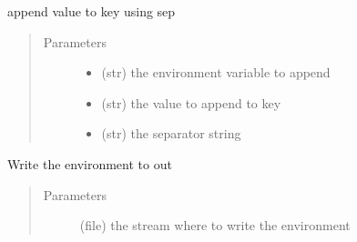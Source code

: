 \documentclass[a4paper,10pt,english]{sphinxmanual}
\begin{document}
\begin{fulllineitems}
\begin{fulllineitems}
\begin{quote}
\begin{description}
\end{description}\end{quote}

\end{fulllineitems}


\begin{fulllineitems}
\label{\detokenize{apidoc_src/src:src.environment.SalomeEnviron.append}}
append value to key using sep
\begin{quote}\begin{description}
\item[{Parameters}] \leavevmode\begin{itemize}
\item {} 
 \textendash{} (str) the environment variable to append

\item {} 
 \textendash{} (str) the value to append to key

\item {} 
 \textendash{} (str) the separator string

\end{itemize}

\end{description}\end{quote}

\end{fulllineitems}


\begin{fulllineitems}
\label{\detokenize{apidoc_src/src:src.environment.SalomeEnviron.dump}}
Write the environment to out
\begin{quote}\begin{description}
\item[{Parameters}] \leavevmode
{} \textendash{} (file) the stream where to write the environment

\end{description}\end{quote}


\end{fulllineitems}
\end{fulllineitems}
\end{document}
